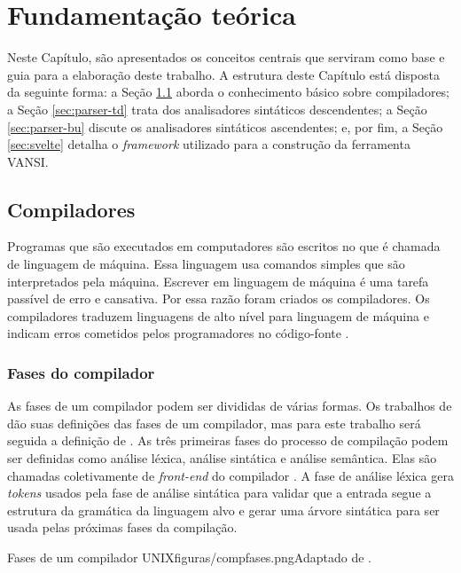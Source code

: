 \chapter{Fundamentação teórica}
\label{chap:fundamentacao-teorica}

Neste Capítulo, são apresentados os conceitos centrais que serviram como base e guia para a elaboração deste trabalho. A estrutura deste Capítulo está disposta da seguinte forma: a Seção \ref{sec:comp} aborda o conhecimento básico sobre compiladores; a Seção \ref{sec:parser-td} trata dos analisadores sintáticos descendentes; a Seção \ref{sec:parser-bu} discute os analisadores sintáticos ascendentes; e, por fim, a Seção \ref{sec:svelte} detalha o \textit{framework} utilizado para a construção da ferramenta VANSI.

\section{Compiladores}
\label{sec:comp}
Programas que são executados em computadores são escritos no que é chamada de linguagem de máquina. Essa linguagem usa comandos simples que são interpretados pela máquina. Escrever em linguagem de máquina é uma tarefa passível de erro e cansativa. Por essa razão foram criados os compiladores. Os compiladores traduzem linguagens de alto nível para linguagem de máquina e indicam erros cometidos pelos programadores no código-fonte \cite{mogensen2024introduction}.

\subsection{Fases do compilador}
As fases de um compilador podem ser divididas de várias formas. Os trabalhos de \textcite{cooper2022engineering,mogensen2024introduction, thain2020introduction} dão suas definições das fases de um compilador, mas para este trabalho será seguida a definição de \textcite{thain2020introduction}. As três primeiras fases do processo de compilação podem ser definidas como análise léxica, análise sintática e análise semântica. Elas são chamadas coletivamente de \textit{front-end} do compilador \cite{mogensen2024introduction}. A fase de análise léxica gera \textit{tokens} usados pela fase de análise sintática para validar que a entrada segue a estrutura da gramática da linguagem alvo e gerar uma árvore sintática para ser usada pelas próximas fases da compilação.


\begin{mypicture}{\label{fig:compfases}}{Fases de um compilador UNIX}{figuras/compfases.png}{Adaptado de \textcite{thain2020introduction}.}
\end{mypicture}


